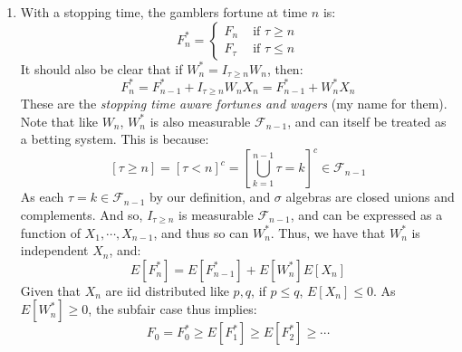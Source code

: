 \documentclass[12pt,a4paper]{article}
\newcommand{\1}[1]{\mathbbm{1}\left\{ #1 \right\}}
\newcommand{\fcal}{\mathcal{F}}
\begin{document}
\begin{enumerate}
	\item With a stopping time, the gamblers fortune at time $n$ is:
	$$
		F^*_n = \begin{cases}
		F_n & \text{ if $\tau \geq n$}\\
		F_\tau & \text{ if $\tau \leq n$}
		\end{cases}
	$$
	It should also be clear that if $W^*_n = I_{\tau \geq n} W_n$, then:
	$$
		F_n^* = F_{n-1}^* + I_{\tau \geq n} W_nX_n = F_{n-1}^* + W_n^*X_n
	$$
	These are the \textit{stopping time aware fortunes and wagers} (my name for them). Note that like $W_n$, $W_n^*$ is also measurable $\fcal_{n-1}$, and can itself be treated as a betting system. This is because:
	$$
		\left[\tau \geq n\right] = \left[\tau < n\right]^c = \left[\bigcup_{k=1}^{n-1} \tau = k\right]^c \in \fcal_{n-1}
	$$
	As each $\tau = k \in \fcal_{n-1}$ by our definition, and $\sigma$ algebras are closed unions and complements. And so, $I_{\tau \geq n}$ is measurable $\fcal_{n-1}$, and can be expressed as a function of $X_1, \cdots, X_{n-1}$, and thus so can $W_n^*$. Thus, we have that $W_n^*$ is independent $X_n$, and:
	$$
		E[F_n^*] = E[F_{n-1}^*] + E[W_n^*]E[X_n]
	$$
	Given that $X_n$ are iid distributed like $p,q$, if $p \leq q$, $E[X_n] \leq 0$. As $E[W_n^*] \geq 0$, the subfair case thus implies:
	$$
		F_0 = F_0^* \geq E[F_1^*] \geq E[F_2^*] \geq \cdots
	$$
\end{enumerate}
\end{document}
